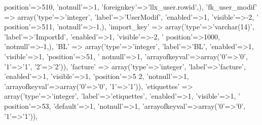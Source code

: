 \begin{DoxyCode}
{      position'}=>510, \textcolor{stringliteral}{'notnull'}=>1, \textcolor{stringliteral}{'foreignkey'}=>\textcolor{stringliteral}{'llx\_user.rowid'},),
        \textcolor{stringliteral}{'fk\_user\_modif'} => array(\textcolor{stringliteral}{'type'}=>\textcolor{stringliteral}{'integer'}, \textcolor{stringliteral}{'label'}=>\textcolor{stringliteral}{'UserModif'}, \textcolor{stringliteral}{'enabled'}=>1, \textcolor{stringliteral}{'visible'}=>-2, \textcolor{stringliteral}{'
      position'}=>511, \textcolor{stringliteral}{'notnull'}=>-1,),
        \textcolor{stringliteral}{'import\_key'} => array(\textcolor{stringliteral}{'type'}=>\textcolor{stringliteral}{'varchar(14)'}, \textcolor{stringliteral}{'label'}=>\textcolor{stringliteral}{'ImportId'}, \textcolor{stringliteral}{'enabled'}=>1, \textcolor{stringliteral}{'visible'}=>-2, \textcolor{stringliteral}{'
      position'}=>1000, \textcolor{stringliteral}{'notnull'}=>-1,),
        \textcolor{stringliteral}{'BL'} => array(\textcolor{stringliteral}{'type'}=>\textcolor{stringliteral}{'integer'}, \textcolor{stringliteral}{'label'}=>\textcolor{stringliteral}{'BL'}, \textcolor{stringliteral}{'enabled'}=>1, \textcolor{stringliteral}{'visible'}=>1, \textcolor{stringliteral}{'position'}=>51, \textcolor{stringliteral}{'
      notnull'}=>1, \textcolor{stringliteral}{'arrayofkeyval'}=>array(\textcolor{charliteral}{'0'}=>\textcolor{charliteral}{'0'}, \textcolor{charliteral}{'1'}=>\textcolor{charliteral}{'1'}, \textcolor{charliteral}{'2'}=>\textcolor{charliteral}{'2'})),
        \textcolor{stringliteral}{'facture'} => array(\textcolor{stringliteral}{'type'}=>\textcolor{stringliteral}{'integer'}, \textcolor{stringliteral}{'label'}=>\textcolor{stringliteral}{'facture'}, \textcolor{stringliteral}{'enabled'}=>1, \textcolor{stringliteral}{'visible'}=>1, \textcolor{stringliteral}{'position'}=>5
      2, \textcolor{stringliteral}{'notnull'}=>1, \textcolor{stringliteral}{'arrayofkeyval'}=>array(\textcolor{charliteral}{'0'}=>\textcolor{charliteral}{'0'}, \textcolor{charliteral}{'1'}=>\textcolor{charliteral}{'1'})),
        \textcolor{stringliteral}{'etiquettes'} => array(\textcolor{stringliteral}{'type'}=>\textcolor{stringliteral}{'integer'}, \textcolor{stringliteral}{'label'}=>\textcolor{stringliteral}{'etiquettes'}, \textcolor{stringliteral}{'enabled'}=>1, \textcolor{stringliteral}{'visible'}=>1, \textcolor{stringliteral}{'
      position'}=>53, \textcolor{stringliteral}{'default'}=>1, \textcolor{stringliteral}{'notnull'}=>1, \textcolor{stringliteral}{'arrayofkeyval'}=>array(\textcolor{charliteral}{'0'}=>\textcolor{charliteral}{'0'}, \textcolor{charliteral}{'1'}=>\textcolor{charliteral}{'1'})),

\end{DoxyCode}
